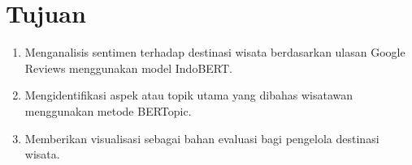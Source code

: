\section{Tujuan}

\begin{enumerate}
    \item Menganalisis sentimen terhadap destinasi wisata berdasarkan ulasan Google Reviews menggunakan model IndoBERT.
    
    \item Mengidentifikasi aspek atau topik utama yang dibahas wisatawan menggunakan metode BERTopic.
    
    \item Memberikan visualisasi sebagai bahan evaluasi bagi pengelola destinasi wisata.
\end{enumerate}
